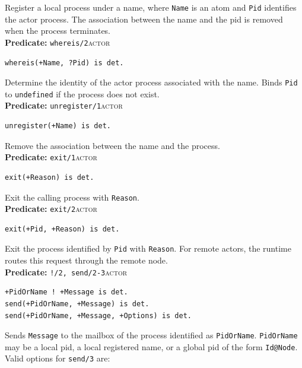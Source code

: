 \noindent Register a local process under a name, where \texttt{Name} is an atom
and \texttt{Pid} identifies the actor process. The association between the name
and the pid is removed when the process terminates.\\

\noindent \textbf{Predicate:} \texttt{whereis/2}\hfill\textsc{actor}

\begin{verbatim}
whereis(+Name, ?Pid) is det.
\end{verbatim}

\noindent Determine the identity of the actor process associated with the name.
Binds \texttt{Pid} to \texttt{undefined} if the process does not exist.\\

\noindent \textbf{Predicate:} \texttt{unregister/1}\hfill\textsc{actor}

\begin{verbatim}
unregister(+Name) is det.
\end{verbatim}

\noindent Remove the association between the name and the process.\\

\noindent \textbf{Predicate:} \texttt{exit/1}\hfill\textsc{actor}

\begin{verbatim}
exit(+Reason) is det.
\end{verbatim}

\noindent Exit the calling process with \texttt{Reason}.\\

\noindent \textbf{Predicate:} \texttt{exit/2}\hfill\textsc{actor}

\begin{verbatim}
exit(+Pid, +Reason) is det.
\end{verbatim}

\noindent Exit the process identified by \texttt{Pid} with \texttt{Reason}. For
remote actors, the runtime routes this request through the remote node.\\

\noindent \textbf{Predicate:} \texttt{!/2, send/2-3}\hfill\textsc{actor}

\begin{verbatim}
+PidOrName ! +Message is det.
send(+PidOrName, +Message) is det.
send(+PidOrName, +Message, +Options) is det.
\end{verbatim}

\noindent Sends \texttt{Message} to the mailbox of the process identified as
\texttt{PidOrName}. \texttt{PidOrName} may be a local pid, a local registered
name, or a global pid of the form \texttt{Id@Node}. Valid options for
\texttt{send/3} are:

